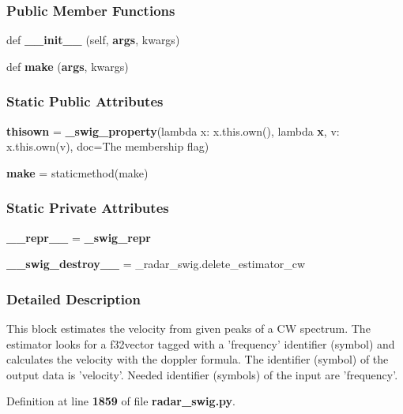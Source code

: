 \subsubsection*{Public Member Functions}
\begin{DoxyCompactItemize}
\item 
def {\bf \+\_\+\+\_\+init\+\_\+\+\_\+} (self, {\bf args}, kwargs)
\item 
def {\bf make} ({\bf args}, kwargs)
\end{DoxyCompactItemize}
\subsubsection*{Static Public Attributes}
\begin{DoxyCompactItemize}
\item 
{\bf thisown} = {\bf \+\_\+swig\+\_\+property}(lambda x\+: x.\+this.\+own(), lambda {\bf x}, v\+: x.\+this.\+own(v), doc=\textquotesingle{}The membership flag\textquotesingle{})
\item 
{\bf make} = staticmethod(make)
\end{DoxyCompactItemize}
\subsubsection*{Static Private Attributes}
\begin{DoxyCompactItemize}
\item 
{\bf \+\_\+\+\_\+repr\+\_\+\+\_\+} = {\bf \+\_\+swig\+\_\+repr}
\item 
{\bf \+\_\+\+\_\+swig\+\_\+destroy\+\_\+\+\_\+} = \+\_\+radar\+\_\+swig.\+delete\+\_\+estimator\+\_\+cw
\end{DoxyCompactItemize}


\subsubsection{Detailed Description}
\begin{DoxyVerb}This block estimates the velocity from given peaks of a CW spectrum. The estimator looks for a f32vector tagged with a 'frequency' identifier (symbol) and calculates the velocity with the doppler formula. The identifier (symbol) of the output data is 'velocity'. Needed identifier (symbols) of the input are 'frequency'.\end{DoxyVerb}
 

Definition at line {\bf 1859} of file {\bf radar\+\_\+swig.\+py}.



